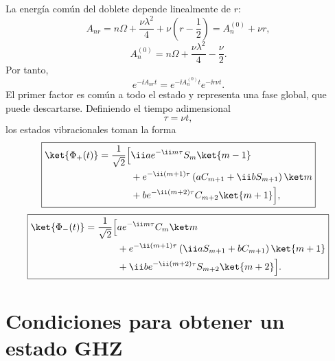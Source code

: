 La energ\'ia com\'un del doblete depende linealmente de $r$:
\begin{equation}
  A_{nr}
  =
  n\Omega+\frac{\nu\lambda^2}{4}
  +\nu\left(r-\frac12\right)
  =
  A_n^{(0)}+\nu r,
\end{equation}
\begin{equation}
  A_n^{(0)}
  =
  n\Omega+\frac{\nu\lambda^2}{4}-\frac{\nu}{2}.
\end{equation}
Por tanto,
\begin{equation}
  e^{-\ii A_{nr}t}
  =
  e^{-\ii A_n^{(0)}t}e^{-\ii r\nu t}.
\end{equation}
El primer factor es com\'un a todo el estado y representa una fase global, que
puede descartarse. Definiendo el tiempo adimensional
\begin{equation}
  \tau=\nu t,
\end{equation}
los estados vibracionales toman la forma
\begin{equation}
  \boxed{
  \begin{aligned}
  \ket{\Phi_+(t)}
  =\frac{1}{\sqrt2}\Big[&
  \ii a e^{-\ii m\tau}S_m\ket{m-1}
  \\
  &+e^{-\ii(m+1)\tau}
  \left(aC_{m+1}+\ii bS_{m+1}\right)\ket m
  \\
  &+b e^{-\ii(m+2)\tau}C_{m+2}\ket{m+1}
  \Big],
  \end{aligned}
  }
\end{equation}
\begin{equation}
  \boxed{
  \begin{aligned}
  \ket{\Phi_-(t)}
  =\frac{1}{\sqrt2}\Big[&
  a e^{-\ii m\tau}C_m\ket m
  \\
  &+e^{-\ii(m+1)\tau}
  \left(\ii aS_{m+1}+bC_{m+1}\right)\ket{m+1}
  \\
  &+\ii b e^{-\ii(m+2)\tau}S_{m+2}\ket{m+2}
  \Big].
  \end{aligned}
  }
\end{equation}

\section{Condiciones para obtener un estado GHZ}

